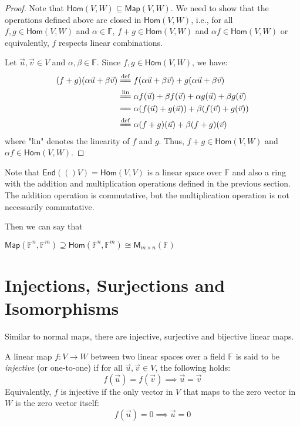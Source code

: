 \documentclass[
	11pt, %
	fleqn, %
	a4paper, %
]{LegrandOrangeBook}
\newcommand{\End}[1]{\mathsf{End}(#1)} %
\newcommand{\Hom}{\mathsf{Hom}} %
\newcommand{\F}{\mathbb{F}} %
\newcommand{\M}[2]{\mathsf{M}_{#1}(#2)} %
\newcommand{\Map}{\mathsf{Map}} %
\begin{document}
\begin{proof}
    Note that $\Hom(V, W) \subseteq \Map(V, W)$. We need to show that the operations defined above are closed in $\Hom(V, W)$, i.e., for all $f, g \in \Hom(V, W)$ and $\alpha \in \F$, $f + g \in \Hom(V, W)$ and $\alpha f \in \Hom(V, W)$ or equivalently, $f$ respects linear combinations.

    Let $\vec{u}, \vec{v} \in V$ and $\alpha, \beta \in \F$. Since $f, g \in \Hom(V, W)$, we have:
    \[
        \begin{split}
            (f + g)(\alpha\vec{u} + \beta\vec{v}) &\overset{\mathrm{def}}{=\joinrel=} f(\alpha\vec{u} + \beta\vec{v}) + g(\alpha\vec{u} + \beta\vec{v}) \\
            &\overset{\mathrm{lin}}{=\joinrel=} \alpha f(\vec{u}) + \beta f(\vec{v}) + \alpha g(\vec{u}) + \beta g(\vec{v}) \\
            &=\joinrel= \alpha (f(\vec{u}) + g(\vec{u})) + \beta (f(\vec{v}) + g(\vec{v})) \\
            &\overset{\mathrm{def}}{=\joinrel=} \alpha (f + g)(\vec{u}) + \beta (f + g)(\vec{v})
        \end{split}
    \]
    where "lin" denotes the linearity of $f$ and $g$. Thus, $f + g \in \Hom(V, W)$ and $\alpha f \in \Hom(V, W)$.
\end{proof}

\begin{remark}
    Note that $\End(V) = \Hom(V, V)$ is a linear space over $\F$ and also a ring with the addition and multiplication operations defined in the previous section. The addition operation is commutative, but the multiplication operation is not necessarily commutative.
\end{remark}

Then we can say that 
\begin{center}
    $\Map(\F^n, \F^m) \supseteq \Hom(\F^n, \F^m) \cong \M{m \times n}{\F}$
\end{center}


\newpage

\section{Injections, Surjections and Isomorphisms}

Similar to normal maps, there are injective, surjective and bijective linear maps.

\begin{definition}
    A linear map $f: V \to W$ between two linear spaces over a field $\F$ is said to be \emph{injective} (or one-to-one) if for all $\vec{u}, \vec{v} \in V$, the following holds:
    \[
        f(\vec{u}) = f(\vec{v}) \implies \vec{u} = \vec{v}
    \]
    Equivalently, $f$ is injective if the only vector in $V$ that maps to the zero vector in $W$ is the zero vector itself:
    \[
        f(\vec{u}) = 0 \implies \vec{u} = 0
    \]
\end{definition}
\end{document}
